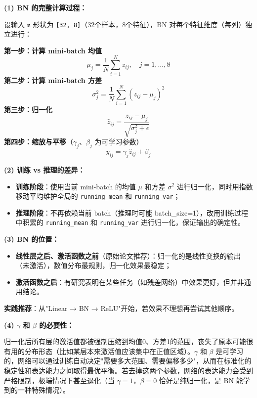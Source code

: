 \documentclass[a4paper,11pt]{ctexart}
\begin{document}
\begin{solutionbox}[参考答案与详细解析]
    \textbf{(1) BN 的完整计算过程：}

    设输入 $\mathbf{z}$ 形状为 \texttt{[32, 8]}（32个样本，8个特征），BN 对每个特征维度（每列）独立进行：

    \textbf{第一步：计算 mini-batch 均值}
    \[
    \mu_j = \frac{1}{N}\sum_{i=1}^{N} z_{ij}, \quad j=1,\ldots,8
    \]
    \textbf{第二步：计算 mini-batch 方差}
    \[
    \sigma_j^2 = \frac{1}{N}\sum_{i=1}^{N}(z_{ij}-\mu_j)^2
    \]
    \textbf{第三步：归一化}
    \[
    \hat{z}_{ij} = \frac{z_{ij}-\mu_j}{\sqrt{\sigma_j^2+\epsilon}}
    \]
    \textbf{第四步：缩放与平移}（$\gamma_j$、$\beta_j$ 为可学习参数）
    \[
    y_{ij} = \gamma_j \hat{z}_{ij} + \beta_j
    \]

    \textbf{(2) 训练 vs 推理的差异：}

    \begin{itemize}
        \item \textbf{训练阶段}：使用当前 mini-batch 的均值 $\mu$ 和方差 $\sigma^2$ 进行归一化，同时用指数移动平均维护全局的 \texttt{running\_mean} 和 \texttt{running\_var}；
        \item \textbf{推理阶段}：不再依赖当前 batch（推理时可能 batch\_size=1），改用训练过程中积累的 \texttt{running\_mean} 和 \texttt{running\_var} 进行归一化，保证输出的确定性。
    \end{itemize}

    \textbf{(3) BN 的位置：}

    \begin{itemize}
        \item \textbf{线性层之后、激活函数之前}（原始论文推荐）：归一化的是线性变换的输出（未激活），数值分布最规则，归一化效果最稳定；
        \item \textbf{激活函数之后}：有研究表明在某些任务（如残差网络）中效果更好，但并非通用结论。
    \end{itemize}

    \textbf{实践推荐}：从"Linear → BN → ReLU"开始，若效果不理想再尝试其他顺序。

    \textbf{(4) $\gamma$ 和 $\beta$ 的必要性：}

    归一化后所有层的激活值都被强制压缩到均值0、方差1的范围，丧失了原本可能很有用的分布形态（比如某层本来激活值应该集中在正值区域）。$\gamma$ 和 $\beta$ 是可学习的，网络可以通过训练自动决定"需要多大范围、需要偏移多少"，从而在标准化的稳定性和表达能力之间取得最优平衡。若去掉这两个参数，网络的表达能力会受到严格限制，极端情况下甚至退化（当 $\gamma=1$，$\beta=0$ 恰好是纯归一化，是 BN 能学到的一种特殊情况）。


\end{solutionbox}
\end{document}
